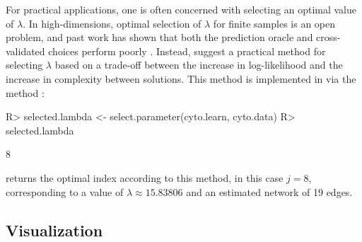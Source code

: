 \documentclass[article]{jss}
\renewcommand{\|}{\,|\,}
\begin{document}
For practical applications, one is often concerned with selecting an optimal value of $\lambda$. In high-dimensions, optimal selection of $\lambda$ for finite samples is an open problem, and past work has shown that both the prediction oracle and cross-validated choices perform poorly \citep{meinshausen2006,fu2013}. Instead, \citet{fu2013} suggest a practical method for selecting $\lambda$ based on a trade-off between the increase in log-likelihood and the increase in complexity between solutions. This method is implemented in  via the method :
%
\begin{CodeChunk}
\begin{CodeInput}
R> selected.lambda <- select.parameter(cyto.learn, cyto.data)
R> selected.lambda
\end{CodeInput}
\begin{CodeOutput}
[1] 8
\end{CodeOutput}
\end{CodeChunk}
%
 returns the optimal index according to this method, in this case $j=8$, corresponding to a value of $\lambda\approx15.83806$ and an estimated network of 19 edges.

\subsection{Visualization}
\label{subsec:viz}
\end{document}
